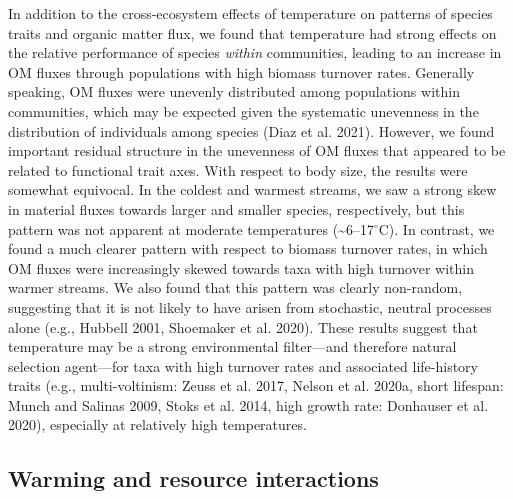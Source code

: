 \documentclass[
]{article}
\numberwithin{equation}
\begin{document}
In addition to the cross-ecosystem effects of temperature on patterns of
species traits and organic matter flux, we found that temperature had
strong effects on the relative performance of species \emph{within}
communities, leading to an increase in OM fluxes through populations
with high biomass turnover rates. Generally speaking, OM fluxes were
unevenly distributed among populations within communities, which may be
expected given the systematic unevenness in the distribution of
individuals among species (Diaz et al. 2021). However, we found
important residual structure in the unevenness of OM fluxes that
appeared to be related to functional trait axes. With respect to body
size, the results were somewhat equivocal. In the coldest and warmest
streams, we saw a strong skew in material fluxes towards larger and
smaller species, respectively, but this pattern was not apparent at
moderate temperatures (\textasciitilde6--17\(^\circ\)C). In contrast, we
found a much clearer pattern with respect to biomass turnover rates, in
which OM fluxes were increasingly skewed towards taxa with high turnover
within warmer streams. We also found that this pattern was clearly
non-random, suggesting that it is not likely to have arisen from
stochastic, neutral processes alone (e.g., Hubbell 2001, Shoemaker et
al. 2020). These results suggest that temperature may be a strong
environmental filter---and therefore natural selection agent---for taxa
with high turnover rates and associated life-history traits (e.g.,
multi-voltinism: Zeuss et al. 2017, Nelson et al. 2020a, short lifespan:
Munch and Salinas 2009, Stoks et al. 2014, high growth rate: Donhauser
et al. 2020), especially at relatively high temperatures.

\hypertarget{warming-and-resource-interactions}{%
\subsection{Warming and resource
interactions}\label{warming-and-resource-interactions}}
\end{document}

